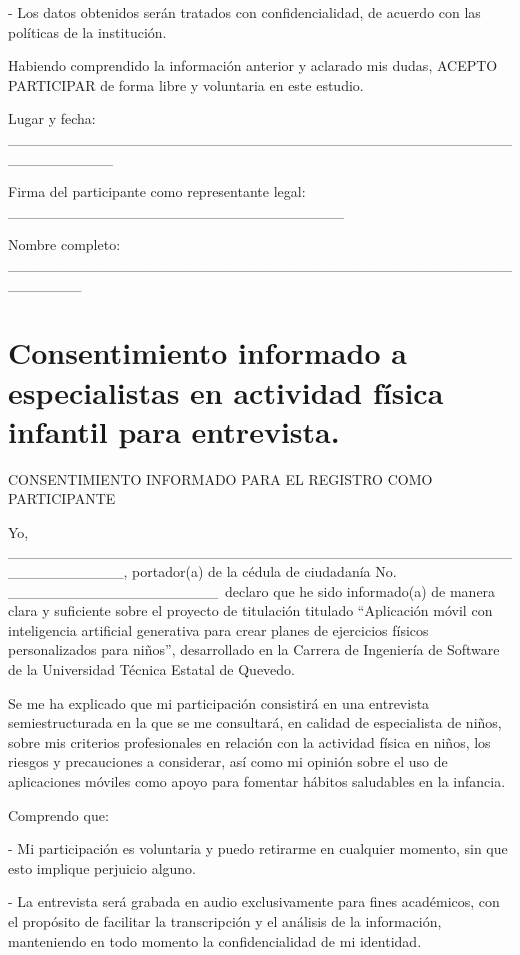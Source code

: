 		- Los datos obtenidos serán tratados con confidencialidad, de acuerdo con las políticas de la institución.
		
		Habiendo comprendido la información anterior y aclarado mis dudas, ACEPTO PARTICIPAR de forma libre y voluntaria en este estudio.
		
		Lugar y fecha: \_\_\_\_\_\_\_\_\_\_\_\_\_\_\_\_\_\_\_\_\_\_\_\_\_\_\_\_\_\_\_\_\_\_\_\_\_\_\_\_\_\_\_\_\_\_\_\_\_\_\_\_\_\_\_\_\_\_
		
		\vspace{24pt}
		Firma del participante como representante legal: \_\_\_\_\_\_\_\_\_\_\_\_\_\_\_\_\_\_\_\_\_\_\_\_\_\_\_\_\_\_\_\_
		
		Nombre completo: \_\_\_\_\_\_\_\_\_\_\_\_\_\_\_\_\_\_\_\_\_\_\_\_\_\_\_\_\_\_\_\_\_\_\_\_\_\_\_\_\_\_\_\_\_\_\_\_\_\_\_\_\_\_\_
	
	\section[Entrevistas a especializas de la actividad física]{Consentimiento informado a especialistas en actividad física infantil para entrevista.}
		
		CONSENTIMIENTO INFORMADO PARA EL REGISTRO COMO PARTICIPANTE
		
		Yo, \_\_\_\_\_\_\_\_\_\_\_\_\_\_\_\_\_\_\_\_\_\_\_\_\_\_\_\_\_\_\_\_\_\_\_\_\_\_\_\_\_\_\_\_\_\_\_\_\_\_\_\_\_\_\_\_\_\_\_, portador(a) de la cédula de ciudadanía No. \_\_\_\_\_\_\_\_\_\_\_\_\_\_\_\_\_\_\_\_\, declaro que he sido informado(a) de manera clara y suficiente sobre el proyecto de titulación titulado ``Aplicación móvil con inteligencia artificial generativa para crear planes de ejercicios físicos personalizados para niños'', desarrollado en la Carrera de Ingeniería de Software de la Universidad Técnica Estatal de Quevedo.
		
		Se me ha explicado que mi participación consistirá en una entrevista semiestructurada en la que se me consultará, en calidad de especialista de niños, sobre mis criterios profesionales en relación con la actividad física en niños, los riesgos y precauciones a considerar, así como mi opinión sobre el uso de aplicaciones móviles como apoyo para fomentar hábitos saludables en la infancia.
		
		Comprendo que:
		
		- Mi participación es voluntaria y puedo retirarme en cualquier momento, sin que esto implique perjuicio alguno.
		
		- La entrevista será grabada en audio exclusivamente para fines académicos, con el propósito de facilitar la transcripción y el análisis de la información, manteniendo en todo momento la confidencialidad de mi identidad.
		

